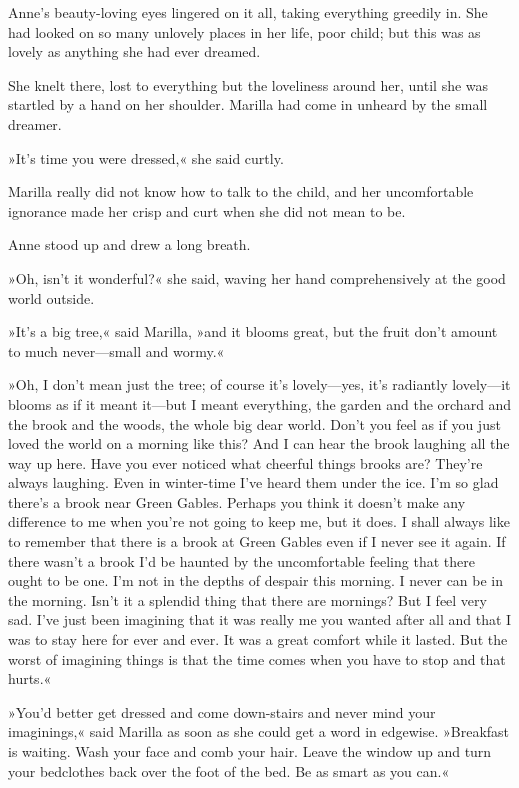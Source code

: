 Anne's beauty-loving eyes lingered on it all, taking everything greedily in. She had looked on so many unlovely places in her life, poor child; but this was as lovely as anything she had ever dreamed.

She knelt there, lost to everything but the loveliness around her, until she was startled by a hand on her shoulder. Marilla had come in unheard by the small dreamer.

»It's time you were dressed,« she said curtly.

Marilla really did not know how to talk to the child, and her uncomfortable ignorance made her crisp and curt when she did not mean to be.

Anne stood up and drew a long breath.

»Oh, isn't it wonderful?« she said, waving her hand comprehensively at the good world outside.

»It's a big tree,« said Marilla, »and it blooms great, but the fruit don't amount to much never—small and wormy.«

»Oh, I don't mean just the tree; of course it's lovely—yes, it's radiantly lovely—it blooms as if it meant it—but I meant everything, the garden and the orchard and the brook and the woods, the whole big dear world. Don't you feel as if you just loved the world on a morning like this? And I can hear the brook laughing all the way up here. Have you ever noticed what cheerful things brooks are? They're always laughing. Even in winter-time I've heard them under the ice. I'm so glad there's a brook near Green Gables. Perhaps you think it doesn't make any difference to me when you're not going to keep me, but it does. I shall always like to remember that there is a brook at Green Gables even if I never see it again. If there wasn't a brook I'd be haunted by the uncomfortable feeling that there ought to be one. I'm not in the depths of despair this morning. I never can be in the morning. Isn't it a splendid thing that there are mornings? But I feel very sad. I've just been imagining that it was really me you wanted after all and that I was to stay here for ever and ever. It was a great comfort while it lasted. But the worst of imagining things is that the time comes when you have to stop and that hurts.«

»You'd better get dressed and come down-stairs and never mind your imaginings,« said Marilla as soon as she could get a word in edgewise. »Breakfast is waiting. Wash your face and comb your hair. Leave the window up and turn your bedclothes back over the foot of the bed. Be as smart as you can.«


